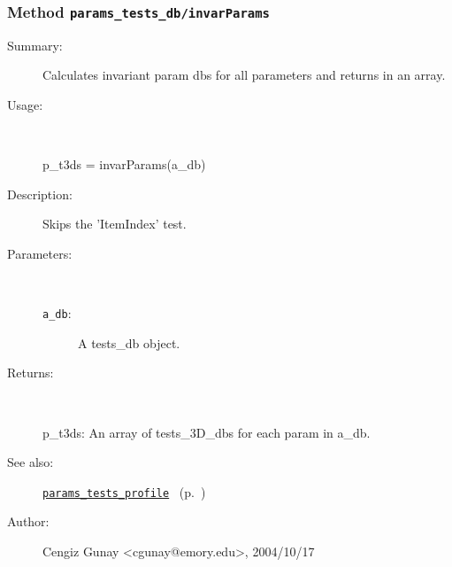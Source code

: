 \subsubsection[Method \texttt{invarParams}]{Method \texttt{params\_tests\_db/invarParams}}%
%
\label{ref_params_tests_db__invarParams}%
\hypertarget{ref_params_tests_db__invarParams}{}%
\begin{description}
\item[Summary:]Calculates invariant param dbs for all parameters and returns in an array.
%
\item[Usage:]~%
\begin{lyxcode}%
p\_t3ds = invarParams(a\_db)
%
\end{lyxcode}%
%
\item[Description:]%
Skips the 'ItemIndex' test.
\item[Parameters:]~
\begin{description}%
\item[\texttt{a\_db}:]
 A tests\_db object.
\end{description}%
%
\item[Returns:]~

	p\_t3ds: An array of tests\_3D\_dbs for each param in a\_db.
%
%
\item[See also:]%
\hyperlink{ref_params_tests_profile}{\texttt{params\_tests\_profile}}%
\ (p.~\pageref{ref_params_tests_profile})%
%
%
\item[Author:]%
Cengiz Gunay <cgunay@emory.edu>, 2004/10/17%
\end{description}
\methodline%
